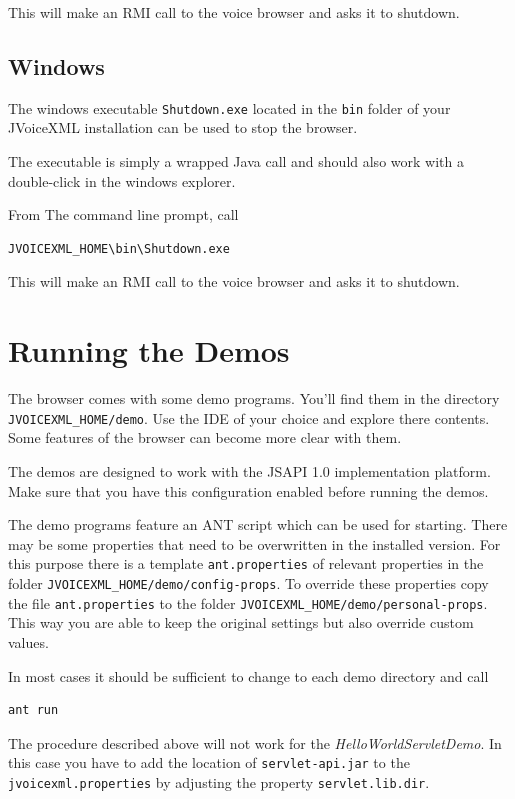 \documentclass[11pt,a4paper]{book}
\begin{document}
This will make an RMI call to the voice browser and asks it to shutdown.

\subsection{Windows}

The windows executable \texttt{Shutdown.exe} located in the \texttt{bin}
folder of your JVoiceXML installation can be used to stop the browser.

The executable is simply a wrapped Java call and should also work with a
double-click in the windows explorer.

From The command line prompt, call

\begin{lstlisting}
JVOICEXML_HOME\bin\Shutdown.exe
\end{lstlisting}

This will make an RMI call to the voice browser and asks it to shutdown.

\section{Running the Demos}

The browser comes with some demo programs. You'll find them in the
directory \texttt{JVOICEXML\_HOME/demo}. Use the IDE of your choice
and explore there contents. Some features of the browser can 
become more clear with them.

The demos are designed to work with the JSAPI 1.0 implementation platform. Make
sure that you have this configuration enabled before running the demos.

The demo programs feature an ANT script which can be used for starting.
There may be some properties that need to be overwritten in the installed
version. For this purpose there is a template \lstinline{ant.properties} of
relevant properties in the folder \lstinline{JVOICEXML_HOME/demo/config-props}.
To override these properties copy the file \texttt{ant.properties} to the
folder \lstinline{JVOICEXML_HOME/demo/personal-props}. This way you are able
to keep the original settings but also override custom values.

In most cases it should be sufficient to change to each demo directory
and call

\begin{lstlisting}
ant run
\end{lstlisting}

The procedure described above will not work for the
\emph{HelloWorldServletDemo}. In this case you have to add the location of
\texttt{servlet-api.jar} to the \texttt{jvoicexml.properties} by adjusting the
property \texttt{servlet.lib.dir}.
\end{document}

